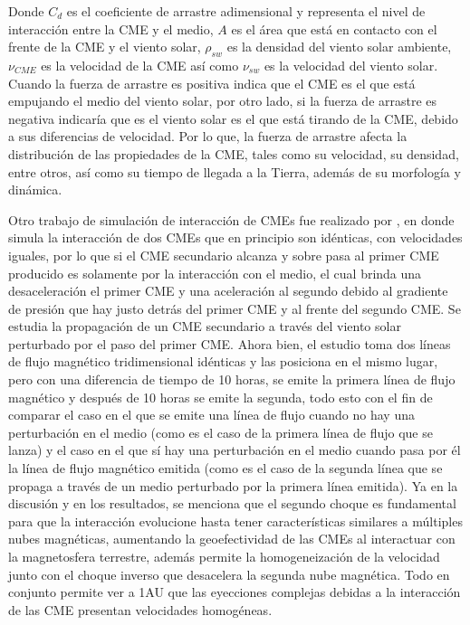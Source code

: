 Donde $C_d$ es el coeficiente de arrastre adimensional y representa el nivel de interacción entre la \ac{CME} y el medio, $A$ es el área que está en contacto con el frente de la \ac{CME} y el viento solar, $\rho_{sw}$ es la densidad del viento solar ambiente, $\nu_{CME}$ es la velocidad de la \ac{CME} así como $\nu_{sw}$ es la velocidad del viento solar. Cuando la fuerza de arrastre es positiva indica que el \ac{CME} es el que está empujando el medio del viento solar, por otro lado, si la fuerza de arrastre es negativa indicaría que es el viento solar es el que está tirando de la CME, debido a sus diferencias de velocidad. Por lo que, la fuerza de arrastre afecta la distribución de las propiedades de la CME, tales como su velocidad, su densidad, entre otros, así como su tiempo de llegada a la Tierra, además de su morfología y dinámica.


Otro trabajo de simulación de interacción de \acp{CME} fue realizado por \cite{lugaz-2017}, en donde simula la interacción de dos \acp{CME} que en principio son idénticas, con velocidades iguales, por lo que si el \ac{CME} secundario alcanza y sobre pasa al primer \ac{CME} producido es solamente por la interacción con el medio, el cual brinda una desaceleración el primer \ac{CME} y una aceleración al segundo debido al gradiente de presión que hay justo detrás del primer \ac{CME} y al frente del segundo CME. Se estudia la propagación de un \ac{CME} secundario a través del viento solar perturbado por el paso del primer CME.
Ahora bien, el estudio toma dos líneas de flujo magnético tridimensional idénticas y las posiciona en el mismo lugar, pero con una diferencia de tiempo de 10 horas, se emite la primera línea de flujo magnético y después de 10 horas se emite la segunda, todo esto con el fin de comparar el caso en el que se emite una línea de flujo cuando no hay una perturbación en el medio (como es el caso de la primera línea de flujo que se lanza) y el caso en el que sí hay una perturbación en el medio cuando pasa por él la línea de flujo magnético emitida (como es el caso de la segunda línea que se propaga a través de un medio perturbado por la primera línea emitida).
Ya en la discusión y en los resultados, se menciona que el segundo choque es fundamental para que la interacción evolucione hasta tener características similares a múltiples nubes magnéticas, aumentando la geoefectividad de las \acp{CME} al interactuar con la magnetosfera terrestre, además permite la homogeneización de la velocidad junto con el choque inverso que desacelera la segunda nube magnética. Todo en conjunto permite ver a 1AU que las eyecciones complejas debidas a la interacción de las \ac{CME} presentan velocidades homogéneas.
